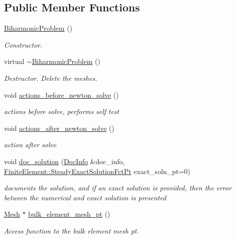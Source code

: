 \subsection*{Public Member Functions}
\begin{DoxyCompactItemize}
\item 
\hyperlink{classoomph_1_1BiharmonicProblem_aa7f9273c26bd98238edb58363db9a02e}{Biharmonic\+Problem} ()
\begin{DoxyCompactList}\small\item\em Constructor. \end{DoxyCompactList}\item 
virtual \hyperlink{classoomph_1_1BiharmonicProblem_aa8a0fd0fdaa257149f4f513d383d9178}{$\sim$\+Biharmonic\+Problem} ()
\begin{DoxyCompactList}\small\item\em Destructor. Delete the meshes. \end{DoxyCompactList}\item 
void \hyperlink{classoomph_1_1BiharmonicProblem_a161f8a00ca635684bfd54880925cd5bf}{actions\+\_\+before\+\_\+newton\+\_\+solve} ()
\begin{DoxyCompactList}\small\item\em actions before solve, performs self test \end{DoxyCompactList}\item 
void \hyperlink{classoomph_1_1BiharmonicProblem_ad685995c81201b8e5dfa7136e1858713}{actions\+\_\+after\+\_\+newton\+\_\+solve} ()
\begin{DoxyCompactList}\small\item\em action after solve \end{DoxyCompactList}\item 
void \hyperlink{classoomph_1_1BiharmonicProblem_a4f978440c83f738544b15995d0c6a178}{doc\+\_\+solution} (\hyperlink{classoomph_1_1DocInfo}{Doc\+Info} \&doc\+\_\+info, \hyperlink{classoomph_1_1FiniteElement_a690fd33af26cc3e84f39bba6d5a85202}{Finite\+Element\+::\+Steady\+Exact\+Solution\+Fct\+Pt} exact\+\_\+soln\+\_\+pt=0)
\begin{DoxyCompactList}\small\item\em documents the solution, and if an exact solution is provided, then the error between the numerical and exact solution is presented \end{DoxyCompactList}\item 
\hyperlink{classoomph_1_1Mesh}{Mesh} $\ast$ \hyperlink{classoomph_1_1BiharmonicProblem_a3ead105fc8c4ebc9c9ba6ca443f4f0fd}{bulk\+\_\+element\+\_\+mesh\+\_\+pt} ()
\begin{DoxyCompactList}\small\item\em Access function to the bulk element mesh pt. \end{DoxyCompactList}\end{DoxyCompactItemize}
